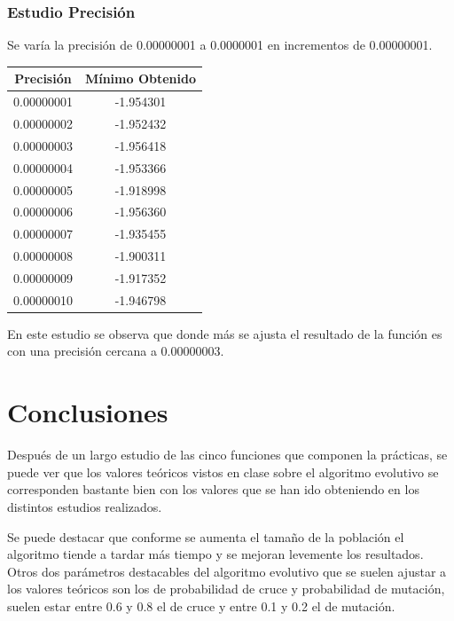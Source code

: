 \documentclass[12pt]{article}
\begin{document}
\subsubsection*{Estudio Precisión}
	Se varía la precisión de 0.00000001 a 0.0000001 en incrementos de 0.00000001.
\begin{table}[H]
\begin{center}
\begin{tabular}{|cc|} \hline
Precisión & Mínimo Obtenido \\  \hline
0.00000001 & -1.954301 \\ 
0.00000002 & -1.952432 \\ 
0.00000003 & -1.956418 \\
0.00000004 & -1.953366 \\
0.00000005 & -1.918998 \\
0.00000006 & -1.956360 \\
0.00000007 & -1.935455 \\
0.00000008 & -1.900311 \\ 
0.00000009 & -1.917352 \\
0.00000010 & -1.946798 \\  \hline
\end{tabular}
\end{center}
\end{table}
	En este estudio se observa que donde más se ajusta el resultado de la función es con una precisión cercana a 0.00000003. 

\section{Conclusiones}
	Después de un largo estudio de las cinco funciones que componen la prácticas, se puede ver que los valores teóricos
    vistos en clase sobre el algoritmo evolutivo se corresponden bastante bien con los valores que se han ido obteniendo
    en los distintos estudios realizados.

    Se puede destacar que conforme se aumenta el tamaño de la población el algoritmo
    tiende a tardar más tiempo y se mejoran levemente los resultados. Otros dos parámetros destacables del algoritmo evolutivo
    que se suelen ajustar a los valores teóricos son los de probabilidad de cruce y probabilidad de mutación, suelen estar
    entre 0.6 y 0.8 el de cruce y entre 0.1 y 0.2 el de mutación.
\end{document}
